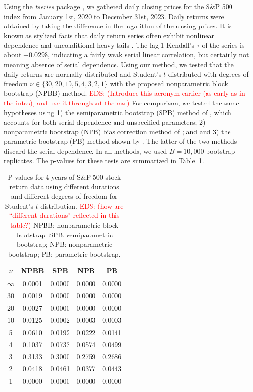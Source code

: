 \documentclass[APA,Times1COL]{WileyNJDv5} %
\newcommand{\eds}[1]{\textcolor{red}{EDS: (#1)}}
\begin{document}
Using the \textsl{tseries} package \citep{tseries}, 
we gathered daily closing prices for the S\&P 500 index from January 1st, 2020
to December 31st, 2023. Daily returns were obtained by taking the difference in
the logarithm of the closing prices. 
It is known as stylized facts that daily return series often exhibit nonlinear
dependence and unconditional heavy tails \citep[e.g.,][]{ryden1998stylized,
  cont2001empirical}. The lag-1 Kendall's $\tau$ of the series is
about $-0.0298$, indicating a fairly weak serial linear correlation, but
certainly not meaning absence of serial dependence.
Using our method, we tested that the daily returns are normally
distributed and Student's $t$ distributed 
with degrees of freedom $\nu \in \{30, 20, 10, 5, 4, 3, 2, 1\}$
with the proposed nonparametric block bootstrap (NPBB) method.
\eds{Introduce this acronym earlier (as early as in the intro), and use it 
throughout the ms.}
For comparison, we tested the same hypotheses using 1) the
semiparametric bootstrap (SPB) method of \citet{zeimbekakis2022misuses},
which accounts for both serial dependence and unspecified parameters;
2) nonparametric bootstrap (NPB) bias correction method of
\citet{babu2004goodness}; and and 3) the parametric bootstrap (PB) method shown
by \citet{zeimbekakis2022misuses}. The latter of the two methods discard the
serial dependence. In all methods, we used $B = 10,000$ bootstrap replicates.
The p-values for these tests are summarized in 
Table~\ref{table:SP5004}.

\begin{table}[ht]
\centering
\caption{P-values for 4 years of S\&P 500 stock return 
  data using different durations
  and different degrees of freedom for Student's $t$ distribution.
	\eds{how are ``different durations'' reflected in this table?}
  NPBB: nonparametric block bootstrap;
  SPB: semiparametric bootstrap;
  NPB: nonparametric bootstrap;
  PB: parametric bootstrap.} 
\label{table:SP5004}
\begin{tabular}{ccccc}
  \toprule
$\nu$ & NPBB & SPB & NPB & PB\\ 
  \midrule
$\infty$ & 0.0001 & 0.0000 & 0.0000 & 0.0000 \\ 
  30 & 0.0019 & 0.0000 & 0.0000 & 0.0000 \\ 
  20 & 0.0027 & 0.0000 & 0.0000 & 0.0000 \\ 
  10 & 0.0125 & 0.0002 & 0.0003 & 0.0003 \\ 
  5 & 0.0610 & 0.0192 & 0.0222 & 0.0141 \\ 
  4 & 0.1037 & 0.0733 & 0.0574 & 0.0499 \\ 
  3 & 0.3133 & 0.3000 & 0.2759 & 0.2686 \\ 
  2 & 0.0418 & 0.0461 & 0.0377 & 0.0443 \\ 
  1 & 0.0000 & 0.0000 & 0.0000 & 0.0000 \\ 
  \bottomrule
\end{tabular}
\end{table}
\end{document}
